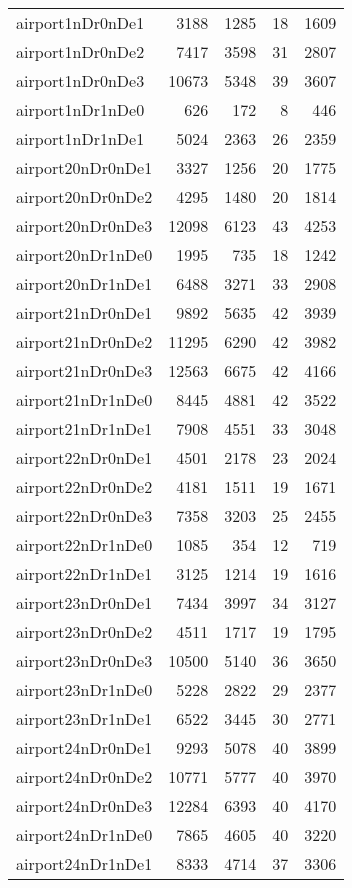 \begin{longtable}{lrrrr}
airport1nDr0nDe1 & 3188 & 1285 & 18 & 1609 \\
airport1nDr0nDe2 & 7417 & 3598 & 31 & 2807 \\
airport1nDr0nDe3 & 10673 & 5348 & 39 & 3607 \\
airport1nDr1nDe0 & 626 & 172 & 8 & 446 \\
airport1nDr1nDe1 & 5024 & 2363 & 26 & 2359 \\
airport20nDr0nDe1 & 3327 & 1256 & 20 & 1775 \\
airport20nDr0nDe2 & 4295 & 1480 & 20 & 1814 \\
airport20nDr0nDe3 & 12098 & 6123 & 43 & 4253 \\
airport20nDr1nDe0 & 1995 & 735 & 18 & 1242 \\
airport20nDr1nDe1 & 6488 & 3271 & 33 & 2908 \\
airport21nDr0nDe1 & 9892 & 5635 & 42 & 3939 \\
airport21nDr0nDe2 & 11295 & 6290 & 42 & 3982 \\
airport21nDr0nDe3 & 12563 & 6675 & 42 & 4166 \\
airport21nDr1nDe0 & 8445 & 4881 & 42 & 3522 \\
airport21nDr1nDe1 & 7908 & 4551 & 33 & 3048 \\
airport22nDr0nDe1 & 4501 & 2178 & 23 & 2024 \\
airport22nDr0nDe2 & 4181 & 1511 & 19 & 1671 \\
airport22nDr0nDe3 & 7358 & 3203 & 25 & 2455 \\
airport22nDr1nDe0 & 1085 & 354 & 12 & 719 \\
airport22nDr1nDe1 & 3125 & 1214 & 19 & 1616 \\
airport23nDr0nDe1 & 7434 & 3997 & 34 & 3127 \\
airport23nDr0nDe2 & 4511 & 1717 & 19 & 1795 \\
airport23nDr0nDe3 & 10500 & 5140 & 36 & 3650 \\
airport23nDr1nDe0 & 5228 & 2822 & 29 & 2377 \\
airport23nDr1nDe1 & 6522 & 3445 & 30 & 2771 \\
airport24nDr0nDe1 & 9293 & 5078 & 40 & 3899 \\
airport24nDr0nDe2 & 10771 & 5777 & 40 & 3970 \\
airport24nDr0nDe3 & 12284 & 6393 & 40 & 4170 \\
airport24nDr1nDe0 & 7865 & 4605 & 40 & 3220 \\
airport24nDr1nDe1 & 8333 & 4714 & 37 & 3306 \\

\end{longtable}
